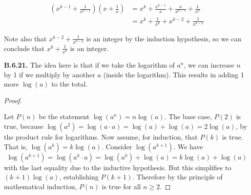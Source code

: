 \documentclass[10pt,]{book}
\theoremstyle{plain}
\theoremstyle{definition}
\theoremstyle{definition}
\theoremstyle{definition}
\theoremstyle{definition}
\numberwithin{equation}{chapter}
\newcommand{\amp}{&}
\begin{document}
\begin{align*}
\left(x^{k-1} + \frac{1}{x^{k-1}}\right)\left(x + \frac{1}{x}\right) \amp = x^k + \frac{x^{k-1}}{x} + \frac{x}{x^{k-1}} + \frac{1}{x^k}\\
\amp = x^k + \frac{1}{x^k} + x^{k-2} + \frac{1}{x^{k-2}}
\end{align*}
%
\par
\hypertarget{p-2326}{}%
Note also that \(x^{k-2} + \frac{1}{x^{k-2}}\) is an integer by the induction hypothesis, so we can conclude that \(x^k + \frac{1}{x^k}\) is an integer.%
\par\smallskip
\noindent\textbf{B.6.21.} \hypertarget{p-2330}{}%
The idea here is that if we take the logarithm of \(a^n\), we can increase \(n\) by 1 if we multiply by another \(a\) (inside the logarithm). This results in adding 1 more \(\log(a)\) to the total.%
\begin{proof}\hypertarget{proof-56}{}
\hypertarget{p-2331}{}%
Let \(P(n)\) be the statement \(\log(a^n) = n \log(a)\). The base case, \(P(2)\) is true, because \(\log(a^2) = \log(a\cdot a) = \log(a) + \log(a) = 2\log(a)\), by the product rule for logarithms. Now assume, for induction, that \(P(k)\) is true. That is, \(\log(a^k) = k\log(a)\). Consider \(\log(a^{k+1})\). We have%
\begin{equation*}
\log(a^{k+1}) = \log(a^k\cdot a) = \log(a^k) + \log(a) = k\log(a) + \log(a)
\end{equation*}
with the last equality due to the inductive hypothesis. But this simplifies to \((k+1) \log(a)\), establishing \(P(k+1)\). Therefore by the principle of mathematical induction, \(P(n)\) is true for all \(n \ge 2\).%
\end{proof}
\par\smallskip
\typeout{************************************************}
\typeout{************************************************}
\end{document}
